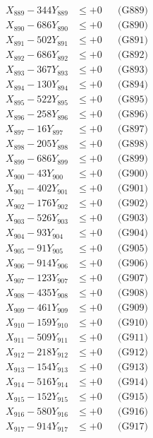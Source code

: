 \documentclass[a4paper,10pt]{article}
\begin{document}
{\begin{align}
X_{889} - 344Y_{889} &\leq +0 && \text{(G889)} \\
X_{890} - 686Y_{890} &\leq +0 && \text{(G890)} \\
\allowbreak
X_{891} - 502Y_{891} &\leq +0 && \text{(G891)} \\
X_{892} - 686Y_{892} &\leq +0 && \text{(G892)} \\
X_{893} - 367Y_{893} &\leq +0 && \text{(G893)} \\
X_{894} - 130Y_{894} &\leq +0 && \text{(G894)} \\
X_{895} - 522Y_{895} &\leq +0 && \text{(G895)} \\
X_{896} - 258Y_{896} &\leq +0 && \text{(G896)} \\
X_{897} - 16Y_{897} &\leq +0 && \text{(G897)} \\
X_{898} - 205Y_{898} &\leq +0 && \text{(G898)} \\
X_{899} - 686Y_{899} &\leq +0 && \text{(G899)} \\
X_{900} - 43Y_{900} &\leq +0 && \text{(G900)} \\
\allowbreak
X_{901} - 402Y_{901} &\leq +0 && \text{(G901)} \\
X_{902} - 176Y_{902} &\leq +0 && \text{(G902)} \\
X_{903} - 526Y_{903} &\leq +0 && \text{(G903)} \\
X_{904} - 93Y_{904} &\leq +0 && \text{(G904)} \\
X_{905} - 91Y_{905} &\leq +0 && \text{(G905)} \\
X_{906} - 914Y_{906} &\leq +0 && \text{(G906)} \\
X_{907} - 123Y_{907} &\leq +0 && \text{(G907)} \\
X_{908} - 435Y_{908} &\leq +0 && \text{(G908)} \\
X_{909} - 461Y_{909} &\leq +0 && \text{(G909)} \\
X_{910} - 159Y_{910} &\leq +0 && \text{(G910)} \\
\allowbreak
X_{911} - 509Y_{911} &\leq +0 && \text{(G911)} \\
X_{912} - 218Y_{912} &\leq +0 && \text{(G912)} \\
X_{913} - 154Y_{913} &\leq +0 && \text{(G913)} \\
X_{914} - 516Y_{914} &\leq +0 && \text{(G914)} \\
X_{915} - 152Y_{915} &\leq +0 && \text{(G915)} \\
X_{916} - 580Y_{916} &\leq +0 && \text{(G916)} \\
X_{917} - 914Y_{917} &\leq +0 && \text{(G917)} \\

\end{align}}
\end{document}
